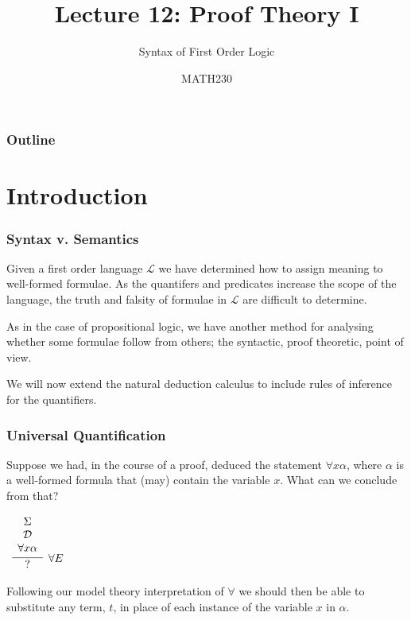 \documentclass{beamer}
\title{Lecture 12: Proof Theory I}
\subtitle{Syntax of First Order Logic}
\author{MATH230}
\institute{Te Kura P\=angarau $\vert$ School of Mathematics and Statistics \\ Te Whare W\=ananga o Waitaha $\vert$ University of Canterbury}
\date{}
\theoremstyle{indentDefn} \newtheorem{defn}[]{Definition}
\begin{document}
\begin{frame}

  \titlepage

\end{frame}

\begin{frame}
  \frametitle{Outline}

  \tableofcontents

\end{frame}

\section{Introduction}

\begin{frame}
  \frametitle{Syntax v. Semantics}

	Given a first order language $\mathcal{L}$ we have determined how to assign meaning to well-formed formulae. As the quantifers and predicates increase the scope of the language, the truth and falsity of formulae in $\mathcal{L}$ are difficult to determine. 
	
	\vspace{0.5cm} 
	
	As in the case of propositional logic, we have another method for analysing whether some formulae follow from others; the syntactic, proof theoretic, point of view. 
	
	\vspace{0.5cm} 
	
	We will now extend the natural deduction calculus to include rules of inference for the quantifiers. 
\end{frame}

\begin{frame}
	\frametitle{Universal Quantification}
	
	Suppose we had, in the course of a proof, deduced the statement $\forall x \alpha$, where $\alpha$ is a well-formed formula that (may) contain the variable $x$. What can we conclude from that? 
	
	\vspace{0.5cm}
	
	\begin{center}
	$\begin{array}{c}
		\infer[\forall E]{\hspace{0.3cm} ? \hspace{0.3cm}}{\begin{array}{c} 
			\Sigma \\
			\mathcal{D} \\ 
			\forall x \alpha			
			\end{array}}
	\end{array}$
	\end{center}

	Following our model theory interpretation of $\forall$ we should then be able to substitute any term, $t$, in place of each instance of the variable $x$ in $\alpha$.
\end{frame}
\end{document}

